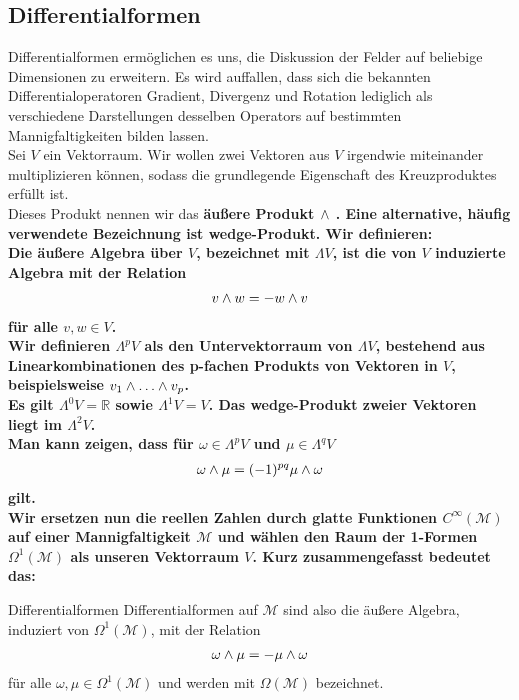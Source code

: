 \subsection{Differentialformen}
Differentialformen ermöglichen es uns, die Diskussion der Felder auf beliebige Dimensionen zu erweitern. Es wird auffallen, dass sich die bekannten Differentialoperatoren Gradient, Divergenz und Rotation lediglich als verschiedene Darstellungen desselben Operators auf bestimmten Mannigfaltigkeiten bilden lassen. \\
Sei $V$ ein Vektorraum. Wir wollen zwei Vektoren aus $V$ irgendwie miteinander multiplizieren können, sodass die grundlegende Eigenschaft des Kreuzproduktes erfüllt ist. \\
Dieses Produkt nennen wir das \bfseries äußere Produkt $\wedge$ \normalfont. Eine alternative, häufig verwendete Bezeichnung ist \bfseries wedge-Produkt. \normalfont
Wir definieren: \\
Die äußere Algebra über $V$, bezeichnet mit $\Lambda V$, ist die von $V$ induzierte Algebra mit der Relation
\begin{align}
v \wedge w = -w \wedge v
\end{align}
für alle $v,w \in V$. \\
Wir definieren $\Lambda^p V$ als den Untervektorraum von $\Lambda V$, bestehend aus Linearkombinationen des p-fachen Produkts von Vektoren in $V$, beispielsweise $v_1 \w \dots \w v_p$. \\
Es gilt $\Lambda^0 V = \mathbb{R}$ sowie $\Lambda^1 V = V$. Das wedge-Produkt zweier Vektoren liegt im $\Lambda^2 V$. \\
Man kann zeigen, dass für $\omega \in \Lambda^p V$ und $\mu \in \Lambda^q V$
\begin{align*}
\omega \wedge \mu = (-1)^{pq} \mu \wedge \omega
\end{align*}
gilt. \\
Wir ersetzen nun die reellen Zahlen durch glatte Funktionen $C^{\infty}(\mathcal{M})$ auf einer Mannigfaltigkeit $\mathcal{M}$ und wählen den Raum der 1-Formen $\Omega^1(\mathcal{M})$ als unseren Vektorraum $V$. Kurz zusammengefasst bedeutet das:
\begin{mybox}{Differentialformen}
Differentialformen auf $\mathcal{M}$ sind also die äußere Algebra, induziert von $\Omega^1(\mathcal{M})$, mit der Relation 
\begin{align*}
\omega \wedge \mu = -\mu \wedge \omega 
\end{align*} 
für alle $\omega, \mu \in \Omega^1(\mathcal{M})$ und werden mit $\Omega(\mathcal{M})$ bezeichnet.
\end{mybox}

